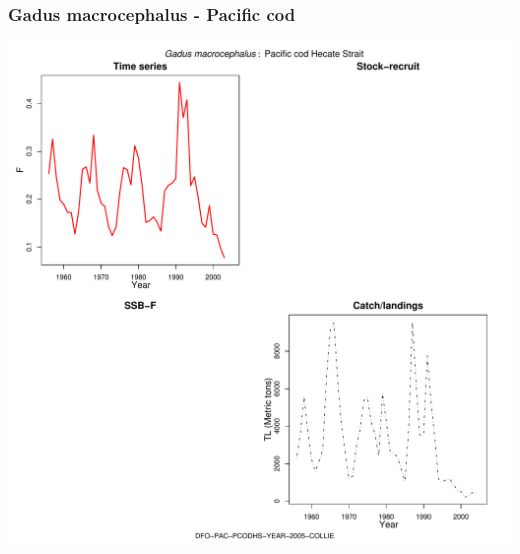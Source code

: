 \subsubsection{Gadus macrocephalus - Pacific cod}
\begin{center}
\includegraphics[width=1.2\textwidth]{../R/figures/DFO-PAC-PCODHS-YEAR-2005-COLLIE.pdf}
\end{center}

